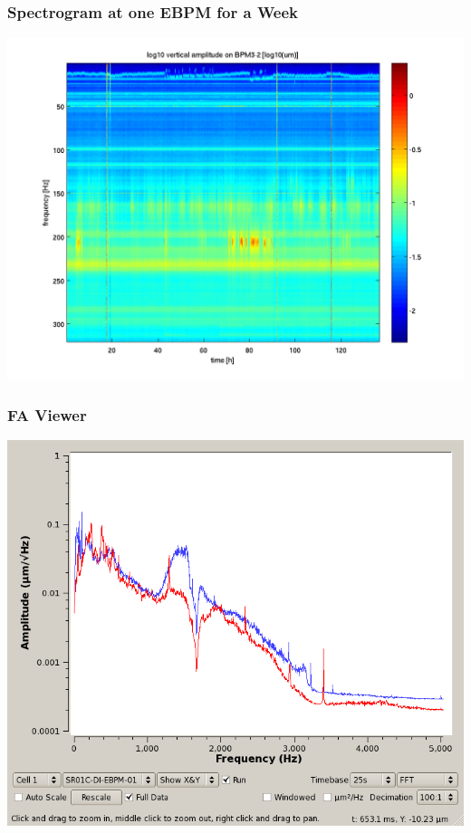 \documentclass{beamer}
\begin{document}
%
\begin{frame}\frametitle{Spectrogram at one EBPM for a Week}
\includegraphics[width=\linewidth]{spectrogram-3-2}
\end{frame}



%
\begin{frame}\frametitle{FA Viewer}
\begin{center}
\includegraphics[width=.85\linewidth]{WEPMN004f6}
\end{center}
\end{frame}


%
\begin{frame}\frametitle{}


\end{frame}

\end{document}
